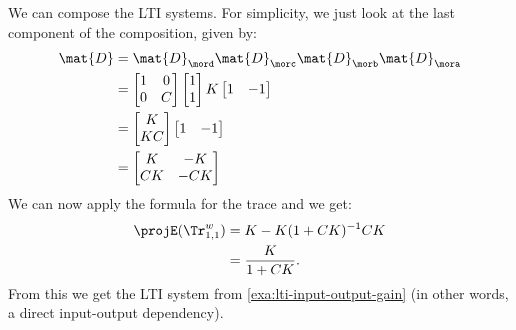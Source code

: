 \begin{example}
    We can compose the LTI systems.
    For simplicity, we just look at the last component of the composition, given by:
    \begin{equation*}
        \begin{aligned}
            \mat{D} & =\mat{D}_\mord \mat{D}_\morc \mat{D}_\morb \mat{D}_\mora \\
                    & =\begin{bmatrix}1 & 0\\ 0 & {C}\end{bmatrix} \begin{bmatrix} 1\\ 1 \end{bmatrix}  K \begin{bmatrix} 1 & -1 \end{bmatrix} \\
                    & =\begin{bmatrix}K \\ {KC}\end{bmatrix}\begin{bmatrix} 1 & -1 \end{bmatrix} \\
                    & =\begin{bmatrix}
                           K  & -K  \\
                           CK & -CK
                       \end{bmatrix}
        \end{aligned}
    \end{equation*}
    We can now apply the formula for the trace and we get:
    \begin{equation*}
        \begin{aligned}
            \projE(\Tr_{1,1}^{w}) & =K - K(1+CK)^{-1}CK \\
                                  & =\frac{K}{1+CK}.
        \end{aligned}
    \end{equation*}
    From this we get the LTI system from \cref{exa:lti-input-output-gain} (in other words, a direct input-output dependency).


\end{example}
